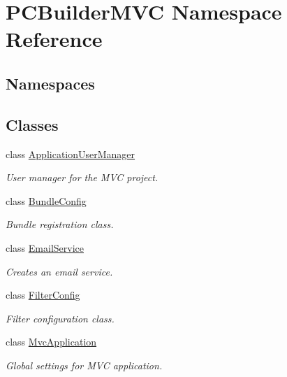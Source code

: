 \hypertarget{namespace_p_c_builder_m_v_c}{}\section{P\+C\+Builder\+M\+VC Namespace Reference}
\label{namespace_p_c_builder_m_v_c}
\subsection*{Namespaces}
\begin{DoxyCompactItemize}
\end{DoxyCompactItemize}
\subsection*{Classes}
\begin{DoxyCompactItemize}
\item 
class \hyperlink{class_p_c_builder_m_v_c_1_1_application_user_manager}{Application\+User\+Manager}
\begin{DoxyCompactList}\small\item\em User manager for the M\+VC project. \end{DoxyCompactList}\item 
class \hyperlink{class_p_c_builder_m_v_c_1_1_bundle_config}{Bundle\+Config}
\begin{DoxyCompactList}\small\item\em Bundle registration class. \end{DoxyCompactList}\item 
class \hyperlink{class_p_c_builder_m_v_c_1_1_email_service}{Email\+Service}
\begin{DoxyCompactList}\small\item\em Creates an email service. \end{DoxyCompactList}\item 
class \hyperlink{class_p_c_builder_m_v_c_1_1_filter_config}{Filter\+Config}
\begin{DoxyCompactList}\small\item\em Filter configuration class. \end{DoxyCompactList}\item 
class \hyperlink{class_p_c_builder_m_v_c_1_1_mvc_application}{Mvc\+Application}
\begin{DoxyCompactList}\small\item\em Global settings for M\+VC application. \end{DoxyCompactList}\item 

\end{DoxyCompactItemize}
